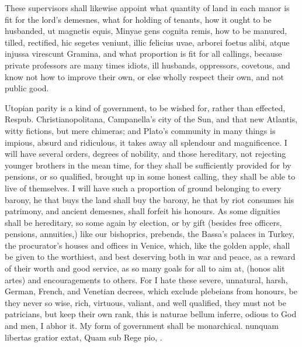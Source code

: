 {These supervisors shall likewise appoint what quantity of land in each
manor is fit for the lord's demesnes, what for holding of tenants,
how it ought to be husbanded, ut magnetis equis, Minyae gens
cognita remis, how to be manured, tilled, rectified, hic segetes
veniunt, illic felicius uvae, arborei foetus alibi, atque injussa
virescunt Gramina, and what proportion is fit for all callings, because
private professors are many times idiots, ill husbands, oppressors,
covetous, and know not how to improve their own, or else wholly respect
their own, and not public good.

Utopian parity is a kind of government, to be wished for, rather
than effected, Respub. Christianopolitana, Campanella's city of the
Sun, and that new Atlantis, witty fictions, but mere chimeras; and
Plato's community in many things is impious, absurd and ridiculous, it
takes away all splendour and magnificence. I will have several orders,
degrees of nobility, and those hereditary, not rejecting younger
brothers in the mean time, for they shall be sufficiently provided for
by pensions, or so qualified, brought up in some honest calling, they
shall be able to live of themselves. I will have such a proportion of
ground belonging to every barony, he that buys the land shall buy the
barony, he that by riot consumes his patrimony, and ancient demesnes,
shall forfeit his honours. As some dignities shall be hereditary,
so some again by election, or by gift (besides free officers, pensions,
annuities,) like our bishoprics, prebends, the Bassa's palaces in
Turkey, the procurator's houses and offices in Venice, which, like
the golden apple, shall be given to the worthiest, and best deserving
both in war and peace, as a reward of their worth and good service, as
so many goals for all to aim at, (honos alit artes) and encouragements
to others. For I hate these severe, unnatural, harsh, German, French,
and Venetian decrees, which exclude plebeians from honours, be they
never so wise, rich, virtuous, valiant, and well qualified, they must
not be patricians, but keep their own rank, this is naturae bellum
inferre, odious to God and men, I abhor it. My form of government shall
be monarchical.
nunquam libertas gratior extat,
Quam sub Rege pio, \etc.

}
